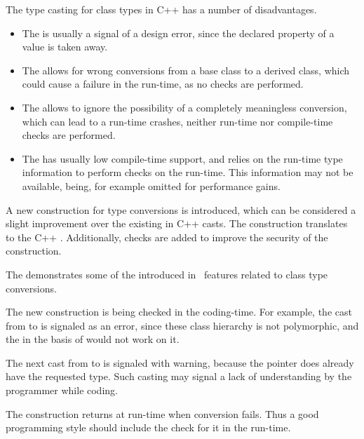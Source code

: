 The type casting for class types in C++ has a number of disadvantages.
\begin{itemize}
 \item The  is usually a signal of a design error, since the 
 declared  property of a value is taken away.
 
 \item The  allows for wrong conversions from a base class to a derived class,
 which could cause a failure in the run-time, as no checks are performed.
 
 \item The  allows to ignore the possibility of  
  a completely meaningless conversion, which can lead to a run-time crashes, neither run-time nor 
  compile-time checks are performed.
 
 \item The  has usually low compile-time support, and relies on the run-time type
  information to perform checks on the run-time. This information may not be available, being,
  for example omitted for performance gains.
\end{itemize}


\pcppsolution

A new construction for type conversions is introduced, which can be considered a slight improvement
over the existing in C++ casts. The  construction translates to the C++ .
Additionally, checks are added to improve the security of the construction.


The  demonstrates some of the introduced in \pcpp\ features related to class type conversions.

The new  construction is being checked in the coding-time. For example, the cast from  to 
 is signaled as an error, since these class hierarchy is not polymorphic, and the 
in the basis of  would not work on it.

The next cast from  to  is signaled with warning, because the  pointer does 
already have the requested type. Such casting may signal a lack of understanding by the programmer while coding.

The  construction returns  at run-time when conversion fails. Thus a good programming style
should include the check for it in the run-time.

